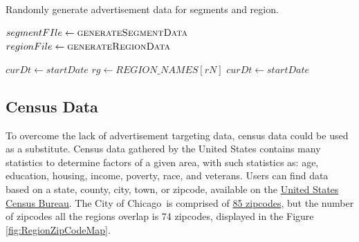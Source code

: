 \documentclass[titlepage,twocolumn]{article}
\newcommand{\CityChicago}{City of Chicago}
\begin{document}
\begin{algorithm}
	\small
	\caption{\small Randomly generate advertisement data for segments and region.}
	\label{alg:2}
	\begin{algorithmic}[1]
		\State $segmentFIle \gets\Call{generateSegmentData}{}$
		\State $ regionFile \gets \Call{generateRegionData}{} $
		
		\EndProcedure
		\State $ curDt \gets startDate $
			\EndFor
		\EndWhile
		\EndFor
		\EndProcedure
		\State $ rg \gets REGION\_NAMES[rN] $
		\State $ curDt \gets startDate $
		\EndFor
		\EndWhile
		\EndFor
		\EndProcedure
	\end{algorithmic}
\end{algorithm}

\subsection{Census Data}
\label{sub:censusData}

\par To overcome the lack of advertisement targeting data, census data could be used as a substitute. Census data gathered by the United States contains many statistics to determine factors of a given area, with such statistics as: age, education, housing, income, poverty, race, and veterans. Users can find data based on a state, county, city, town, or zipcode, available on the \href{https://www.census.gov/}{United States Census Bureau}. The \CityChicago\ is comprised of \href{http://zipcode.org/city/IL/CHICAGO}{85 zipcodes}, but the number of zipcodes all the regions overlap is 74 zipcodes, displayed in the Figure \ref{fig:RegionZipCodeMap}.
\end{document}
